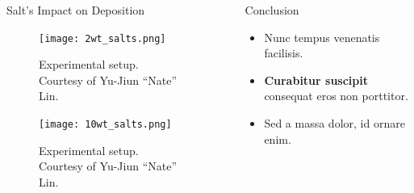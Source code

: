 \documentclass[final]{beamer}
\newlength{\sepwid}
\newlength{\onecolwid}
\newlength{\twocolwid}
\begin{document}
\begin{frame}[t, fragile]
\begin{columns}[t]
\begin{column}{\twocolwid}
\begin{columns}[t,totalwidth=\twocolwid]
\begin{column}{\onecolwid}
\begin{block}{Salt's Impact on Deposition}
\begin{figure}
\texttt{[image: 2wt\_salts.png]}
\caption{Experimental setup. Courtesy of Yu-Jiun ``Nate'' Lin.}
\end{figure}

\begin{figure}
\texttt{[image: 10wt\_salts.png]}
\caption{Experimental setup. Courtesy of Yu-Jiun ``Nate'' Lin.}
\end{figure}

\end{block}


\end{column}	%
\end{columns}	%
\end{column}	%

\begin{column}{\sepwid}\end{column} %
\begin{column}{\onecolwid} 		 %


\begin{block}{Conclusion}

\begin{itemize}
\item Nunc tempus venenatis facilisis. 
\item \textbf{Curabitur suscipit} consequat eros non porttitor. 
\item Sed a massa dolor, id ornare enim. 
\end{itemize}

\end{block}

\end{column}
\end{columns}
\end{frame}
\end{document}
